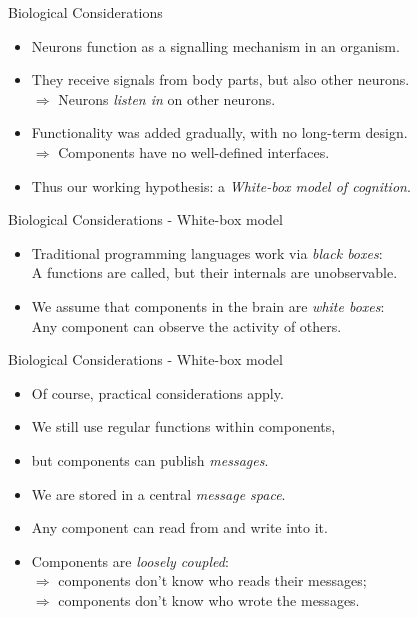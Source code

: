 \documentclass{beamer}
\begin{document}
   \begin{frame}{Biological Considerations}
      \begin{itemize}
         \item Neurons function as a signalling mechanism in an organism.
         \pause
         \item They receive signals from body parts, but also other neurons.\\
            $\Rightarrow$ Neurons \emph{listen in} on other neurons.
         \pause
         \item Functionality was added gradually, with no long-term design.\\
            $\Rightarrow$ Components have no well-defined interfaces.
         \pause
         \item Thus our working hypothesis: a \emph{White-box model of cognition}.
       \end{itemize}
   \end{frame}
   
   \begin{frame}{Biological Considerations - White-box model}
      \begin{itemize}
         \item Traditional programming languages work via \emph{black boxes}:\\
              \vspace{2mm}
               A functions are called, but their internals are unobservable.
               \vspace{2mm}
         \item We assume that components in the brain are \emph{white boxes}:\\
              \vspace{2mm}
               Any component can observe the activity of others.
      \end{itemize}
   \end{frame}
   
   \begin{frame}{Biological Considerations - White-box model}
      \begin{itemize}
         \item Of course, practical considerations apply.
         \vspace{2mm}
         \item We still use regular functions within components,
         \item but components can publish \emph{messages}.
         \item We are stored in a central \emph{message space}.
         \item Any component can read from and write into it.
         \vspace{2mm}
         \item Components are \emph{loosely coupled}:\\
            $\Rightarrow$ components don't know who reads their messages;\\
            $\Rightarrow$ components don't know who wrote the messages.
      \end{itemize}
   \end{frame}
   
\end{document}
